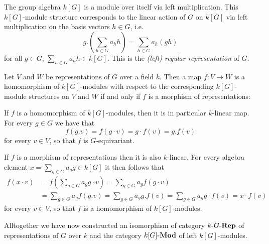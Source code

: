 \begin{definition}
  The group algebra $k[G]$ is a module over itself via left multiplication.
  This $k[G]$-module structure corresponds to the linear action of $G$ on $k[G]$ via left multiplication on the basis vectors $h \in G$, i.e.
  \[
      g.\left( \sum_{h \in G} a_h h \right)
    = \sum_{h \in G} a_h (gh)
  \]
  for all $g \in G$, $\sum_{h \in G} a_h h \in k[G]$.
  This is the \emph{\textup(left\textup) regular representation} of $G$.
\end{definition}


\begin{remark}
  Let $V$ and $W$ be representations of $G$ over a field $k$.
  Then a map $f \colon V \to W$ is a homomorphism of $k[G]$-modules with respect to the corresponding $k[G]$-module structures on $V$ and $W$ if and only if $f$ is a morphism of representations:
  
  If $f$ is a homomorphism of $k[G]$-modules, then it is in particular $k$-linear map.
  For every $g \in G$ we have that
  \[
      f(g.v)
    = f(g \cdot v)
    = g \cdot f(v)
    = g.f(v)
  \]
  for every $v \in V$, so that $f$ is $G$-equivariant.
  
  If $f$ is a morphism of representations then it is also $k$-linear.
  For every algebra element $x = \sum_{g \in G} a_g g \in k[G]$ it then follows that
  \begin{align*}
        f(x \cdot v)
    &=  f\left( \sum_{g \in G} a_g g \cdot v \right)
     =  \sum_{g \in G} a_g f(g \cdot v) \\
    &=  \sum_{g \in G} a_g f(g.v)
     =  \sum_{g \in G} a_g g.f(v)
     =  \sum_{g \in G} a_g g \cdot f(v)
     =  x \cdot f(v)
  \end{align*}
  for every $v \in V$, so that $f$ is a homomorphism of $k[G]$-modules.
  
  Alltogether we have now constructed an isomorphism of category $k\text{-}G\text{-}\mathbf{Rep}$ of representations of $G$ over $k$ and the category $k[G]\text{-}\mathbf{Mod}$ of left $k[G]$-modules.
\end{remark}


